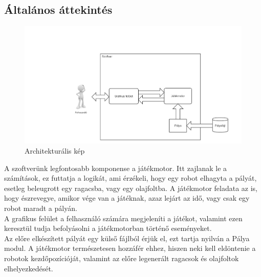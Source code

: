 


\subsection{Általános áttekintés}

\begin{figure}[ht!]
	\centering
	\includegraphics[width=180mm, center]{./chapters/chapter02/dia1.jpg}
	\caption{Architekturális kép \label{overflow}}
\end{figure}

A szoftverünk legfontosabb komponense a játékmotor. Itt zajlanak le a számítások, ez futtatja a logikát, ami érzékeli, hogy egy robot elhagyta a pályát, esetleg beleugrott egy ragacsba, vagy egy olajfoltba. A játékmotor feladata az is, hogy észrevegye, amikor vége van a játéknak, azaz lejárt az idő, vagy csak egy robot maradt a pályán. \\

A grafikus felület a felhasználó számára megjeleníti a játékot, valamint ezen keresztül tudja befolyásolni a játékmotorban történő eseményeket. \\

Az előre elkészített pályát egy külső fájlból érjük el, ezt tartja nyilván a Pálya modul. A játékmotor természetesen hozzáfér ehhez, hiszen neki kell eldöntenie a robotok kezdőpozícióját, valamint az előre legenerált ragacsok és olajfoltok elhelyezkedését. \\


